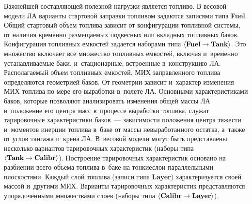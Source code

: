 \begin{multicols}{2}
  Важнейшей составляющей полезной нагрузки является топливо. В весовой 
модели ЛА варианты стартовой заправки топливом задаются записями типа 
\textbf{Fuel}. Общий стартовый объем топлива зависит от 
конфигурации топливной системы, от наличия временно размещаемых 
подвесных или вкладных топливных баков. Конфигурация топливных емкостей 
задается наборами типа 
$\langle \mbox{\textbf{Fuel}}\hm \to \mbox{\textbf{Tank}}\rangle$. Это 
множество включает все множество топливных емкостей, включая и~временно 
устанавливаемые баки, и~стационарные, встроенные в~конструкцию ЛА. 
Располагаемый объем топливных емкостей, МИХ заправленного топлива 
определяются геометрией баков. От геометрии зависит и~характер изменения 
МИХ топлива по мере его выработки 
в~полете ЛА. Основными характеристиками баков, которые позволяют 
анализировать изменения общей массы ЛА и~положение его центра масс 
в~процессе выработки топлива, служат тарировочные характеристики баков~--- 
зависимости положения центра тяжести и~моментов инерции топлива в~баке от 
массы невыработанного остатка, а~также от углов тангажа и~крена ЛА. 
В~весовой модели могут быть представлены несколько вариантов 
тарировочных характеристик (наборы типа 
$\langle \mbox{\textbf{Tank}}\hm \to \mbox{\textbf{Calibr}}\rangle$). 
Построение тарировочных характеристик основано на разбиении всего объема 
топлива в~баке на тонкие\linebreak слои параллельными плоскостями. Каждый слой 
топлива (записи типа \textbf{Layer}) характеризуется своей массой 
и~другими МИХ. Варианты тарировочных характеристик представляются 
упорядоченными множествами слоев (наборы 
типа $\langle \mbox{\textbf{Calibr}}\hm \to \mbox{\textbf{Layer}}\rangle$).


\end{multicols}
